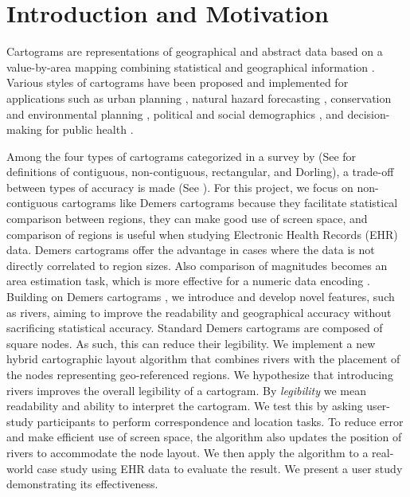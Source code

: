 \section{Introduction and Motivation}

Cartograms are representations of geographical and abstract data based on a value-by-area mapping combining statistical and geographical information \cite{dent2009Cartography,inoue2011New}. 
Various styles of cartograms have been proposed and implemented for applications such as urban planning \cite{harris2018Mapping, arranz-lopez2021Enduser}, natural hazard forecasting \cite{pappenberger2019Cartograms, park2020Flood}, conservation and environmental planning \cite{galluzzi2018Mapping, rocchini2019Cartogramming}, political and social demographics \cite{breitzman2018Using, alieva2021How}, and decision-making for public health \cite{gao2020Visualising, sack2021Visualizing}.

Among the four types of cartograms categorized in a survey by  (See  for definitions of contiguous, non-contiguous, rectangular, and Dorling), a trade-off between types of accuracy is made (See ).
For this project, we focus on non-contiguous cartograms like Demers cartograms because they facilitate statistical comparison between regions, they can make good use of screen space, and comparison of regions is useful when studying Electronic Health Records (EHR) data.
Demers cartograms offer the advantage in cases where the data is not directly correlated to region sizes. Also comparison of magnitudes becomes an area estimation task, which is more effective for a numeric data encoding \cite{munzner2014Visualization}.
Building on Demers cartograms \cite{ian2002Cartogram}, we introduce and develop novel features, such as rivers, aiming to improve the readability and geographical accuracy without sacrificing statistical accuracy.
Standard Demers cartograms are composed of square nodes. As such, this can reduce their legibility.
We implement a new hybrid cartographic layout algorithm that combines rivers with the placement of the nodes representing geo-referenced regions. 
We hypothesize that introducing rivers improves the overall legibility of a cartogram. 
By \textit{legibility} we mean readability and ability to interpret the cartogram.  
We test this by asking user-study participants to perform correspondence and location tasks.
To reduce error and make efficient use of screen space, the algorithm also updates the position of rivers to accommodate the node layout.
We then apply the algorithm to a real-world case study using EHR data to evaluate the result.
We present a user study demonstrating its effectiveness.

